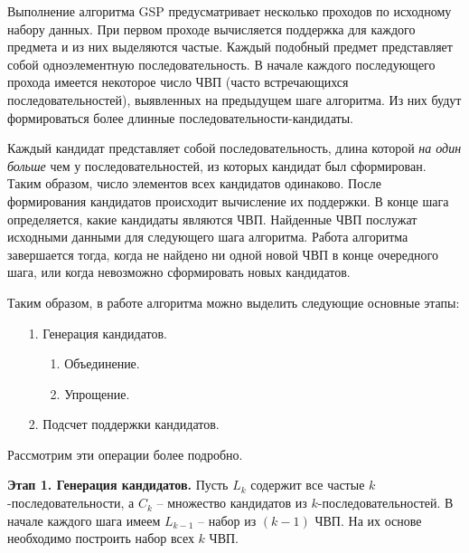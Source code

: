 Выполнение алгоритма GSP предусматривает несколько проходов по исходному набору данных. При первом проходе вычисляется поддержка для каждого предмета и из них выделяются частые. Каждый подобный предмет представляет собой одноэлементную последовательность. В начале каждого последующего прохода имеется некоторое число ЧВП (часто встречающихся последовательностей), выявленных на предыдущем шаге алгоритма. Из них будут формироваться более длинные последовательности-кандидаты.

Каждый кандидат представляет собой последовательность, длина которой \textit{на один больше} чем у последовательностей, из которых кандидат был сформирован. Таким образом, число элементов всех кандидатов одинаково. После формирования кандидатов происходит вычисление их поддержки. В конце шага определяется, какие кандидаты являются ЧВП. Найденные ЧВП послужат исходными данными для следующего шага алгоритма. Работа алгоритма завершается тогда, когда не найдено ни одной новой ЧВП в конце очередного шага, или когда невозможно сформировать новых кандидатов.

Таким образом, в работе алгоритма можно выделить следующие основные этапы:


\begin{enumerate}
	\item[1.] Генерация кандидатов.
	\begin{enumerate}
		\item[1.] Объединение.
		\item[2.] Упрощение.
	\end{enumerate}
	\item[2.] Подсчет поддержки кандидатов.
\end{enumerate}

Рассмотрим эти операции более подробно.

\textbf{Этап 1. Генерация кандидатов.} Пусть $L_k$ содержит все частые $k$-последовательности, а $C_k$ – множество кандидатов из $k$-последовательностей. В начале каждого шага имеем $L_{k-1}$ – набор из $(k-1)$ ЧВП. На их основе необходимо построить набор всех $k$ ЧВП.

